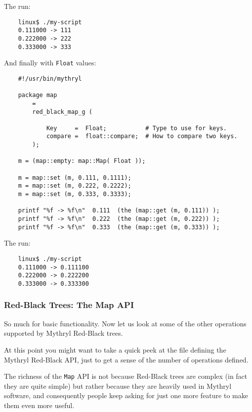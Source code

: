 The run:

\begin{verbatim}
    linux$ ./my-script
    0.111000 -> 111
    0.222000 -> 222
    0.333000 -> 333
\end{verbatim}

And finally with {\tt Float} values:

\begin{verbatim}
    #!/usr/bin/mythryl

    package map
        =
        red_black_map_g (

            Key     =  Float;           # Type to use for keys.
            compare =  float::compare;  # How to compare two keys.
        );

    m = (map::empty: map::Map( Float ));

    m = map::set (m, 0.111, 0.1111);
    m = map::set (m, 0.222, 0.2222);
    m = map::set (m, 0.333, 0.3333);

    printf "%f -> %f\n"  0.111  (the (map::get (m, 0.111)) );
    printf "%f -> %f\n"  0.222  (the (map::get (m, 0.222)) );
    printf "%f -> %f\n"  0.333  (the (map::get (m, 0.333)) );
\end{verbatim}


The run:

\begin{verbatim}
    linux$ ./my-script
    0.111000 -> 0.111100
    0.222000 -> 0.222200
    0.333000 -> 0.333300
\end{verbatim}

\cutend*

\subsubsection{Red-Black Trees:  The Map API}

So much for basic functionality.  Now let us look at some of the 
other operations supported by Mythryl Red-Black trees.

At this point you might want to take a quick peek at the  
 file defining 
the Mythryl Red-Black {\sc API}, just to get a sense of the number 
of operations defined.

The richness of the {\tt Map} {\sc API} is not because 
Red-Black trees are complex (in fact they 
are quite simple) but rather because they are heavily used in Mythryl 
software, and consequently people keep asking for just one more 
feature to make them even more useful.

